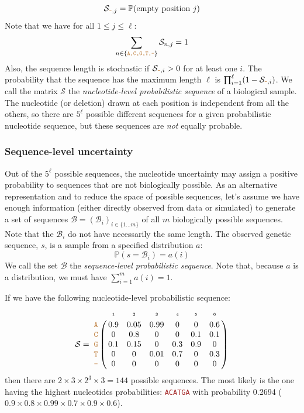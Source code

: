 \documentclass[
]{article}
\newcommand{\sq}[1]{\texttt{\textcolor{brown}{#1}}}
\newcommand{\sps}{\mathcal{B}} %
\newcommand{\nps}{\mathcal{S}} %
\newcommand{\nlps}{nucleotide-level probabilistic sequence\xspace}
\newcommand{\slps}{sequence-level probabilistic sequence\xspace}
\newcommand{\pr}[1]{\mathbb{P}(#1)}
\begin{document}
\begin{equation}
\nps_{\sq{-},j} = \pr{\text{empty position }j}
\end{equation} Note that we have for all \(1\leq j \leq \ell\):
\begin{equation}
\sum_{n\in \{ \sq{A,C,G,T,-} \} } \nps_{n, j} = 1
\end{equation} Also, the sequence length is stochastic if
\(\nps_{\sq{-},i}>0\) for at least one \(i\). The probability that the
sequence has the maximum length \(\ell\) is
\(\prod_{i=1}^\ell (1-\nps_{\sq{-},i})\). We call the matrix \(\nps\)
the \emph{\nlps} of a biological sample. The nucleotide (or deletion)
drawn at each position is independent from all the others, so there are
\(5^\ell\) possible different sequences for a given probabilistic
nucleotide sequence, but these sequences are \emph{not} equally
probable.

\hypertarget{sequence-level-uncertainty}{%
\subsubsection{Sequence-level
uncertainty}\label{sequence-level-uncertainty}}

Out of the \(5^\ell\) possible sequences, the nucleotide uncertainty may
assign a positive probability to sequences that are not biologically
possible. As an alternative representation and to reduce the space of
possible sequences, let's assume we have enough information (either
directly observed from data or simulated) to generate a set of sequences
\(\sps = (\sps_i)_{i\in\{1\ldots m\} }\) of all \(m\) biologically
possible sequences. Note that the \(\sps_i\) do not have necessarily the
same length. The observed genetic sequence, \(s\), is a sample from a
specified distribution \(a\): \begin{equation}
\pr{s = \sps_i} = a(i)
\end{equation} We call the set \(\sps\) the \emph{\slps}. Note that,
because \(a\) is a distribution, we must have \(\sum_{i=1}^m a(i) = 1\).

If we have the following \nlps: \[
\nps = 
\bordermatrix{
& \scriptscriptstyle{1} & \scriptscriptstyle{2}& \scriptscriptstyle{3}& \scriptscriptstyle{4} & \scriptscriptstyle{5} & \scriptscriptstyle{6} \cr
\sq{A} & 0.9 & 0.05   & 0.99 & 0 & 0 & 0.6\cr
\sq{C} & 0   & 0.8 & 0 & 0 & 0.1 & 0.1\cr
\sq{G} & 0.1 & 0.15 & 0 & 0.3 & 0.9 & 0\cr
\sq{T} & 0 & 0 & 0.01 & 0.7 & 0 & 0.3\cr
\sq{-} & 0 & 0 & 0 & 0 & 0 & 0\cr
}
\] then there are \(2\times 3 \times 2^3 \times 3 = 144\) possible
sequences. The most likely is the one having the highest nucleotides
probabilities: \sq{ACATGA} with probability 0.2694
(\(0.9\times 0.8\times 0.99 \times 0.7 \times 0.9 \times 0.6\)).
\end{document}
